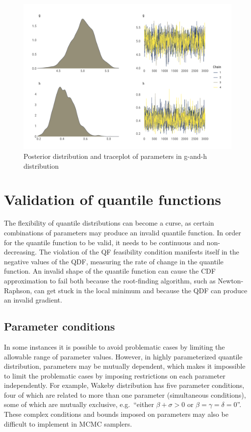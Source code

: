 \documentclass[
  12pt,
]{article}
\begin{document}
\begin{figure}

{\centering \includegraphics[width=0.8\linewidth]{ilbm_article_files/figure-latex/gnh-combo-graph-1} 

}

\caption{Posterior distribution and traceplot of parameters in g-and-h distribution}\label{fig:gnh-combo-graph}
\end{figure}

\hypertarget{validation-of-quantile-functions}{%
\section{Validation of quantile functions}\label{validation-of-quantile-functions}}

The flexibility of quantile distributions can become a curse, as certain combinations of parameters may produce an invalid quantile function. In order for the quantile function to be valid, it needs to be continuous and non-decreasing. The violation of the QF feasibility condition manifests itself in the negative values of the QDF, measuring the rate of change in the quantile function. An invalid shape of the quantile function can cause the CDF approximation to fail both because the root-finding algorithm, such as Newton-Raphson, can get stuck in the local minimum and because the QDF can produce an invalid gradient.

\hypertarget{parameter-conditions}{%
\subsection{Parameter conditions}\label{parameter-conditions}}

In some instances it is possible to avoid problematic cases by limiting the allowable range of parameter values. However, in highly parameterized quantile distribution, parameters may be mutually dependent, which makes it impossible to limit the problematic cases by imposing restrictions on each parameter independently. For example, Wakeby distribution has five parameter conditions, four of which are related to more than one parameter (simultaneous conditions), some of which are mutually exclusive, e.g.~``either \(\beta+\sigma>0\) or \(\beta=\gamma=\delta=0\)''. These complex conditions and bounds imposed on parameters may also be difficult to implement in MCMC samplers.
\end{document}
